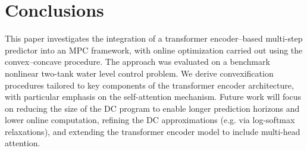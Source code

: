 \documentclass{ifacconf}
\begin{document}
\section{Conclusions} \label{sec:conclu}
This paper investigates the integration of a transformer encoder–based multi-step predictor into an MPC framework, with online optimization carried out using the convex–concave procedure. The approach was evaluated on a benchmark nonlinear two-tank water level control problem. We derive convexification procedures tailored to key components of the transformer encoder architecture, with particular emphasis on the self-attention mechanism. Future work will focus on reducing the size of the DC program to enable longer prediction horizons and lower online computation, refining the DC approximations (e.g. via log-softmax relaxations), and extending the transformer encoder model to include multi-head attention.









\end{document}
